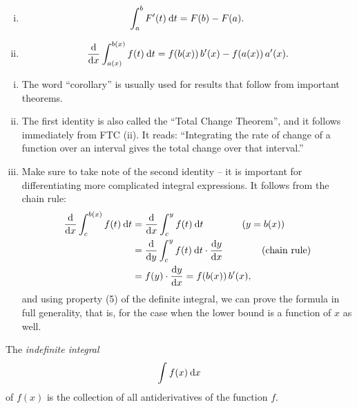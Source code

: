 \begin{corollary}
\label{thm:cor_ftc}
\begin{enumerate}[(i)]
	\item \[ \int_{a}^{b} F'(t) \: \mathrm{d} t = F(b)-F(a). \]
	\item \[ \displaystyle{\frac{\mathrm{d}}{\mathrm{d}x}} \int_{a(x)}^{b(x)} f(t) \: \mathrm{d} t = f(b(x))\,b'(x) - f(a(x))\,a'(x). \]
\end{enumerate}
\end{corollary}

\begin{remark}
\begin{enumerate}[(i)]
	\item The word ``corollary'' is usually used for results that follow from important theorems.
	\item The first identity is also called the ``Total Change Theorem'', and it follows immediately from FTC (ii). It reads: ``Integrating the rate of change of a function over an interval gives the total change over that interval.'' 
	\item Make sure to take note of the second identity -- it is important for differentiating more complicated integral expressions. It follows from the chain rule:
	\begin{equation*}
	\begin{split}
	\displaystyle{\frac{\mathrm{d}}{\mathrm{d}x}} \int_{c}^{b(x)} f(t) \: \mathrm{d} t & = \displaystyle{\frac{\mathrm{d}}{\mathrm{d}x}} \int_{c}^{y} f(t) \: \mathrm{d} t \qquad\qquad (y=b(x)) \\
	& = \displaystyle{\frac{\mathrm{d}}{\mathrm{d}y}} \int_{c}^{y} f(t) \: \mathrm{d} t \cdot \displaystyle{\frac{\mathrm{d}y}{\mathrm{d}x}} \qquad\qquad (\text{chain rule})\\
	& = f(y) \cdot \displaystyle{\frac{\mathrm{d}y}{\mathrm{d}x}} = f(b(x))\,b'(x),
	\end{split}
	\end{equation*}
	and using property (5) of the definite integral, we can prove the formula in full generality, that is, for the case when the lower bound is a function of $x$ as well.
\end{enumerate}	
\end{remark}

\begin{definition}
The \emph{indefinite integral}
\[ \int_{}^{} f(x) \: \mathrm{d} x \]
of $f(x)$ is the collection of all antiderivatives of the function $f$.
\end{definition}

